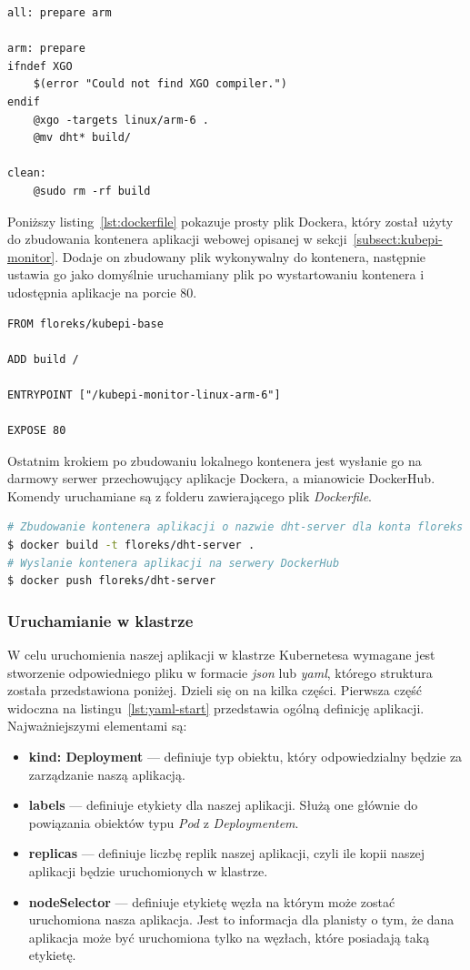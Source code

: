\documentclass[12pt]{report}
\let\Oldsubsubsection\subsubsection
\renewcommand{\subsubsection}{\FloatBarrier\Oldsubsubsection}
\begin{document}
{\begin{lstlisting}[caption=Makefile użyty do budowania aplikacji dla architektury ARM,label=lst:compiling]
all: prepare arm

arm: prepare
ifndef XGO
	$(error "Could not find XGO compiler.")
endif
	@xgo -targets linux/arm-6 .
	@mv dht* build/

clean:
	@sudo rm -rf build
\end{lstlisting}

\newpage
\noindent Poniższy listing~\ref{lst:dockerfile} pokazuje prosty plik Dockera, który został użyty do zbudowania kontenera aplikacji webowej opisanej w sekcji~\ref{subsect:kubepi-monitor}. Dodaje on zbudowany plik wykonywalny do kontenera, następnie ustawia go jako domyślnie uruchamiany plik po wystartowaniu kontenera i udostępnia aplikacje na porcie 80.
\begin{lstlisting}[caption=Przykładowy plik Dockera dla aplikacji webowej,label=lst:dockerfile]
FROM floreks/kubepi-base

ADD build /

ENTRYPOINT ["/kubepi-monitor-linux-arm-6"]

EXPOSE 80
\end{lstlisting}

\noindent Ostatnim krokiem po zbudowaniu lokalnego kontenera jest wysłanie go na darmowy serwer przechowujący aplikacje Dockera, a mianowicie DockerHub. Komendy uruchamiane są z folderu zawierającego plik \textit{Dockerfile}.
\begin{lstlisting}[language=bash]
# Zbudowanie kontenera aplikacji o nazwie dht-server dla konta floreks
$ docker build -t floreks/dht-server .
# Wyslanie kontenera aplikacji na serwery DockerHub
$ docker push floreks/dht-server
\end{lstlisting}


\newpage
\subsubsection{Uruchamianie w klastrze}
W celu uruchomienia naszej aplikacji w klastrze Kubernetesa wymagane jest stworzenie odpowiedniego pliku w formacie \textit{json} lub \textit{yaml}, którego struktura została przedstawiona poniżej. Dzieli się on na kilka części. Pierwsza część widoczna na listingu~\ref{lst:yaml-start} przedstawia ogólną definicję aplikacji. Najważniejszymi elementami są:
\begin{itemize}
\item{\textbf{kind: Deployment} --- definiuje typ obiektu, który odpowiedzialny będzie za zarządzanie naszą aplikacją.}
\item{\textbf{labels} --- definiuje etykiety dla naszej aplikacji. Służą one głównie do powiązania obiektów typu \textit{Pod} z \textit{Deploymentem}.}
\item{\textbf{replicas} --- definiuje liczbę replik naszej aplikacji, czyli ile kopii naszej aplikacji będzie uruchomionych w klastrze.}
\item{\textbf{nodeSelector} --- definiuje etykietę węzła na którym może zostać uruchomiona nasza aplikacja. Jest to informacja dla planisty o tym, że dana aplikacja może być uruchomiona tylko na węzłach, które posiadają taką etykietę.}
\end{itemize}

}
\end{document}
